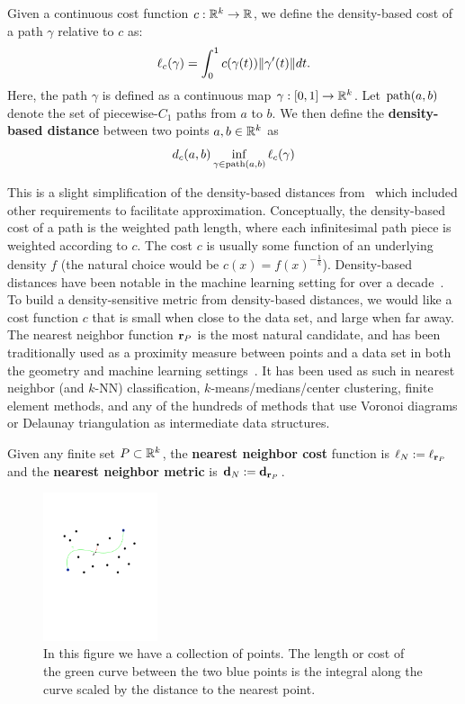 \begin{definition}
Given a continuous cost function $c:\mathbb{R}^k \rightarrow \mathbb{R}$, we define the density-based
cost of a path $\gamma$ relative to $c$ as:
\[ \ell_c(\gamma) = \int_{0}^1 c(\gamma(t)) \| \gamma'(t) \|dt. \]
Here, the path $\gamma$ is defined as a continuous map $\gamma:[0,1]
\to \mathbb{R}^k$.
Let $\mathrm{path}(a,b)$ denote the set of piecewise-$C_1$ paths from $a$ to $b$.
We then define the \textbf{density-based distance} between two points $a, b \in
\mathbb{R}^k$ as
\[ d_c(a,b) \inf_{\gamma\in\mathrm{path}(a,b)} \ell_c(\gamma)\]
\end{definition}

This is a slight simplification of the density-based distances from~\cite{sajama05estimatingDBDM} which included other requirements to facilitate approximation.
Conceptually, the density-based cost of a path is the weighted path length, where each infinitesimal path piece is weighted according to $c$.
The cost $c$ is usually some function of an underlying density $f$ (the natural choice would be $c(x) = f(x)^{-\frac{1}{k}}$).
Density-based distances have been notable in the machine learning setting for over a decade~\cite{sajama05estimatingDBDM,bijral11semiSupLearningDBD}.
To build a density-sensitive metric from density-based distances, we would like a cost function $c$ that is small when close to the data set, and large when far away.
The nearest neighbor function $\mathbf{r}_P$ is the most natural candidate, and has been traditionally used as a proximity measure between points and a data set in both the geometry and machine learning settings~\cite{bijral11semiSupLearningDBD}. It has been used as such in nearest neighbor
(and $k$-NN) classification, $k$-means/medians/center clustering, finite
element methods, and any of the hundreds of methods that use Voronoi
diagrams or Delaunay triangulation as intermediate data structures.

\begin{definition} Given any finite set $P\subset \mathbb{R}^k$, the \textbf{nearest neighbor cost} function is $\ell_N := \ell_{\mathbf{r}_P}$ and the \textbf{nearest neighbor metric} is $\mathbf{d}_N := \mathbf{d}_{\mathbf{r}_P}$.
\end{definition}
\begin{figure}[htbp]
  \centering
    \includegraphics[width=0.3\textwidth]{Figures/example.pdf}
    \caption{In this figure we have a collection of points.
      The length or cost of the green curve between the two blue points
      is the integral along the curve scaled by the distance to the nearest
point.}
  \label{fig:example}
\end{figure}

